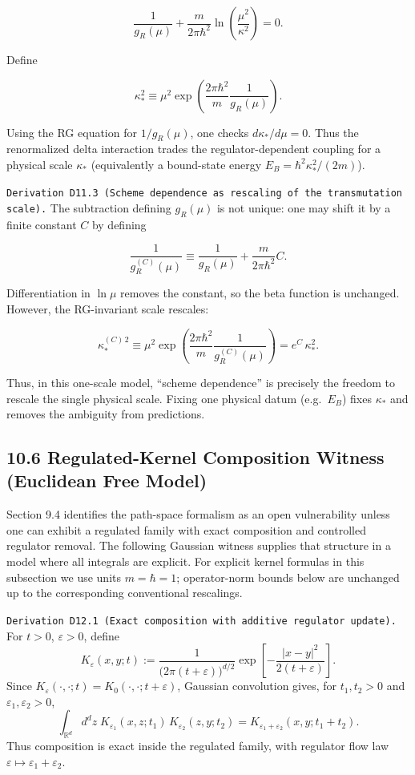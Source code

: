 \documentclass[
]{article}
\begin{document}
\[
\frac{1}{g_R(\mu)}
+\frac{m}{2\pi\hbar^2}\ln\!\left(\frac{\mu^2}{\kappa^2}\right)
=0.
\]

Define

\[
\kappa_\ast^2
\equiv
\mu^2\exp\!\left(\frac{2\pi\hbar^2}{m}\frac{1}{g_R(\mu)}\right).
\]

Using the RG equation for \(1/g_R(\mu)\), one checks
\(d\kappa_\ast/d\mu=0\). Thus the renormalized delta interaction trades
the regulator-dependent coupling for a physical scale \(\kappa_\ast\)
(equivalently a bound-state energy \(E_B=\hbar^2\kappa_\ast^2/(2m)\)).

\texttt{Derivation\ D11.3\ (Scheme\ dependence\ as\ rescaling\ of\ the\ transmutation\ scale).}
The subtraction defining \(g_R(\mu)\) is not unique: one may shift it by
a finite constant \(C\) by defining

\[
\frac{1}{g_R^{(C)}(\mu)}
\equiv
\frac{1}{g_R(\mu)}+\frac{m}{2\pi\hbar^2}C.
\]

Differentiation in \(\ln\mu\) removes the constant, so the beta function
is unchanged. However, the RG-invariant scale rescales:

\[
\kappa_{\ast}^{(C)\,2}
\equiv
\mu^2\exp\!\left(\frac{2\pi\hbar^2}{m}\frac{1}{g_R^{(C)}(\mu)}\right)
=e^{C}\,\kappa_\ast^2.
\]

Thus, in this one-scale model, ``scheme dependence'' is precisely the
freedom to rescale the single physical scale. Fixing one physical datum
(e.g.~\(E_B\)) fixes \(\kappa_\ast\) and removes the ambiguity from
predictions.

\subsection{10.6 Regulated-Kernel Composition Witness (Euclidean Free
Model)}\label{regulated-kernel-composition-witness-euclidean-free-model}

Section 9.4 identifies the path-space formalism as an open vulnerability
unless one can exhibit a regulated family with exact composition and
controlled regulator removal. The following Gaussian witness supplies
that structure in a model where all integrals are explicit. For explicit
kernel formulas in this subsection we use units \(m=\hbar=1\);
operator-norm bounds below are unchanged up to the corresponding
conventional rescalings.

\texttt{Derivation\ D12.1\ (Exact\ composition\ with\ additive\ regulator\ update).}
For \(t>0\), \(\varepsilon>0\), define \[
K_\varepsilon(x,y;t)
:=
\frac{1}{\bigl(2\pi(t+\varepsilon)\bigr)^{d/2}}
\exp\!\left[-\frac{|x-y|^2}{2(t+\varepsilon)}\right].
\] Since
\(K_\varepsilon(\cdot,\cdot;t)=K_0(\cdot,\cdot;t+\varepsilon)\),
Gaussian convolution gives, for \(t_1,t_2>0\) and
\(\varepsilon_1,\varepsilon_2>0\), \[
\int_{\mathbb R^d} d^dz\;
K_{\varepsilon_1}(x,z;t_1)\,
K_{\varepsilon_2}(z,y;t_2)
=
K_{\varepsilon_1+\varepsilon_2}(x,y;t_1+t_2).
\] Thus composition is exact inside the regulated family, with regulator
flow law \(\varepsilon\mapsto\varepsilon_1+\varepsilon_2\).
\end{document}
